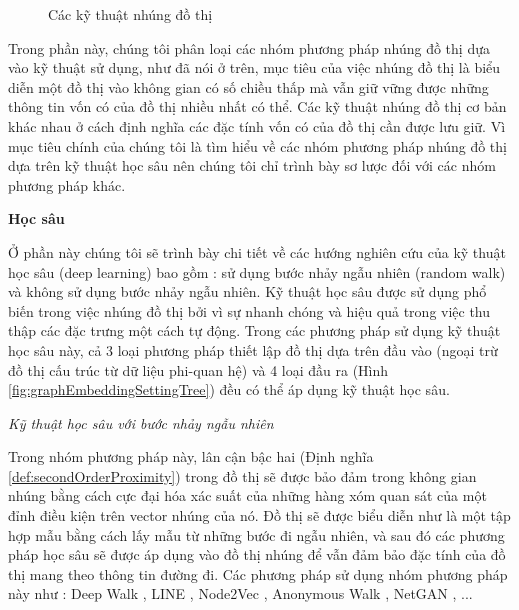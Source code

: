 \begin{figure}[htp]
{
	}
	\caption{Các kỹ thuật nhúng đồ thị}
	\label{fig:graphEmbeddingTechniquesTree}
\end{figure}

Trong phần này, chúng tôi phân loại các nhóm phương pháp nhúng đồ thị dựa vào kỹ thuật sử dụng, như đã nói ở trên, mục tiêu của việc nhúng đồ thị là biểu diễn một đồ thị vào không gian có số chiều thấp mà vẫn giữ vững được những thông tin vốn có của đồ thị nhiều nhất có thể. Các kỹ thuật nhúng đồ thị cơ bản khác nhau ở cách định nghĩa các đặc tính vốn có của đồ thị cần được lưu giữ. Vì mục tiêu chính của chúng tôi là tìm hiểu về các nhóm phương pháp nhúng đồ thị dựa trên kỹ thuật học sâu nên chúng tôi chỉ trình bày sơ lược đối với các nhóm phương pháp khác.

\textbf{Học sâu}

Ở phần này chúng tôi sẽ trình bày chi tiết về các hướng nghiên cứu của kỹ thuật học sâu (deep learning) bao gồm : sử dụng bước nhảy ngẫu nhiên (random walk) và không sử dụng bước nhảy ngẫu nhiên. Kỹ thuật học sâu được sử dụng phổ biến trong việc nhúng đồ thị bởi vì sự nhanh chóng và hiệu quả trong việc thu thập các đặc trưng một cách tự động. Trong các phương pháp sử dụng kỹ thuật học sâu này, cả 3 loại phương pháp thiết lập đồ thị dựa trên đầu vào (ngoại trừ đồ thị cấu trúc từ dữ liệu phi-quan hệ) và 4 loại đầu ra (Hình \ref{fig:graphEmbeddingSettingTree}) đều có thể áp dụng kỹ thuật học sâu. 

\textit{Kỹ thuật học sâu với bước nhảy ngẫu nhiên}

Trong nhóm phương pháp này, lân cận bậc hai (Định nghĩa \ref{def:secondOrderProximity}) trong đồ thị sẽ được bảo đảm trong không gian nhúng bằng cách cực đại hóa xác suất của những hàng xóm quan sát của một đỉnh điều kiện trên vector nhúng của nó. Đồ thị sẽ được biểu diễn như là một tập hợp mẫu bằng cách lấy mẫu từ những bước đi ngẫu nhiên, và sau đó các phương pháp học sâu sẽ được áp dụng vào đồ thị nhúng để vẫn đảm bảo đặc tính của đồ thị mang theo thông tin đường đi. Các phương pháp sử dụng nhóm phương pháp này như : Deep Walk \cite{perozzi2014deepwalk}, LINE \cite{tang2015line}, Node2Vec \cite{grover2016node2vec}, Anonymous Walk \cite{ivanov2018anonymous}, NetGAN \cite{bojchevski2018netgan}, ...

